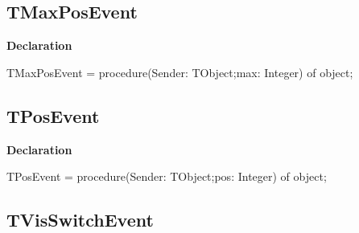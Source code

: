 \documentclass{report}
\newif\ifpdf
\begin{document}
\subsection*{TMaxPosEvent}
\fi
\label{ipkhandle-TMaxPosEvent}
\begin{list}{}{
\setlength{\itemindent}{0cm}
\setlength{\listparindent}{0cm}
\setlength{\leftmargin}{\evensidemargin}
\addtolength{\leftmargin}{\tmplength}
\settowidth{\labelsep}{X}
\addtolength{\leftmargin}{\labelsep}
\setlength{\labelwidth}{\tmplength}
}
\item[\textbf{Declaration}\hfill]
\ifpdf
\begin{flushleft}
\fi
\begin{ttfamily}
TMaxPosEvent = procedure(Sender: TObject;max: Integer) of object;\end{ttfamily}

\ifpdf
\end{flushleft}
\fi

\end{list}
\ifpdf
\subsection*{\large{\textbf{TPosEvent}}\normalsize\hspace{1ex}\hrulefill}
\else
\subsection*{TPosEvent}
\fi
\label{ipkhandle-TPosEvent}
\begin{list}{}{
\setlength{\itemindent}{0cm}
\setlength{\listparindent}{0cm}
\setlength{\leftmargin}{\evensidemargin}
\addtolength{\leftmargin}{\tmplength}
\settowidth{\labelsep}{X}
\addtolength{\leftmargin}{\labelsep}
\setlength{\labelwidth}{\tmplength}
}
\item[\textbf{Declaration}\hfill]
\ifpdf
\begin{flushleft}
\fi
\begin{ttfamily}
TPosEvent = procedure(Sender: TObject;pos: Integer) of object;\end{ttfamily}

\ifpdf
\end{flushleft}
\fi

\end{list}
\ifpdf
\subsection*{\large{\textbf{TVisSwitchEvent}}\normalsize\hspace{1ex}\hrulefill}
\else
\end{document}
